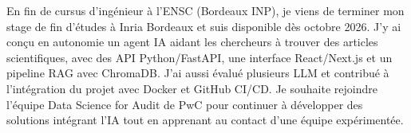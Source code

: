 
\begin{cvparagraph}
En fin de cursus d’ingénieur à l’ENSC (Bordeaux INP), je viens de terminer mon stage de fin d’études à Inria Bordeaux et suis disponible dès octobre 2026. J’y ai conçu en autonomie un agent IA aidant les chercheurs à trouver des articles scientifiques, avec des API Python/FastAPI, une interface React/Next.js et un pipeline RAG avec ChromaDB. J’ai aussi évalué plusieurs LLM et contribué à l’intégration du projet avec Docker et GitHub CI/CD. Je souhaite rejoindre l’équipe Data Science for Audit de PwC pour continuer à développer des solutions intégrant l’IA tout en apprenant au contact d’une équipe expérimentée.
\end{cvparagraph}
